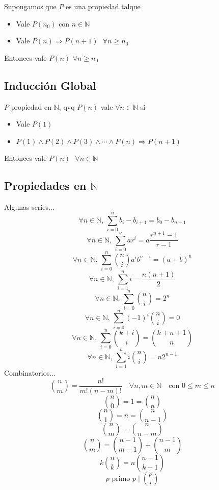 \documentclass[a4paper,10pt]{article}
\begin{document}
Supongamos que $P$ es una propiedad talque
\begin{itemize}
	\item Vale $P(n_0)$ con $n \in \mathbb{N}$
	\item Vale $P(n) \Rightarrow P(n+1) \mbox{ } \forall n \geq n_0$
\end{itemize} 
Entonces vale $P(n)$  $\forall n \geq n_0$


\subsection{Inducción Global}


$P$ propiedad en $\mathbb{N}$, qvq $P(n)$ vale $\forall n \in \mathbb{N}$ si 
\begin{itemize}
	\item Vale $P(1)$
	\item $P(1) \wedge P(2) \wedge P(3) \wedge \cdots \wedge P(n) \Rightarrow P(n+1)$
\end{itemize}
Entonces vale $P(n) \mbox{ } \forall n \in \mathbb{N}$


\subsection{Propiedades en $\mathbb{N}$}


Algunas series...
{\fontsize{12pt}{12pt} \selectfont %
$$\forall n \in \mathbb{N} \mbox{,   } \sum_{i = 0}^{n} {b_{i}-b_{i+1}} = b_{0} - b_{n+1} $$
$$\forall n \in \mathbb{N} \mbox{,   } \sum_{i = 0}^{n} {a{r}^{i}} = a \frac {{r}^{n+1}-1} {r-1} $$
$$\forall n \in \mathbb{N} \mbox{,   } \sum_{i = 0}^{n} {\binom{n}{i} {a}^{i} {b}^{n-i}} = {(a + b)}^n $$
$$\forall n \in \mathbb{N} \mbox{,   } \sum_{i = 1}^{n} {i} = \frac {n(n + 1)} {2} $$
$$\forall n \in \mathbb{N} \mbox{,   } \sum_{i = 0}^{n} {\binom{n}{i}} = 2^{n} $$
$$\forall n \in \mathbb{N} \mbox{,   } \sum_{i = 0}^{n} {{(-1)}^{i}\binom{n}{i}} = 0 $$
$$\forall n \in \mathbb{N} \mbox{,   } \sum_{i = 0}^{n} {\binom{k+i}{i}} = \binom{k+n+1}{n} $$
$$\forall n \in \mathbb{N} \mbox{,   } \sum_{i = 1}^{n} {i\binom{n}{i}} = n {2}^{n-1}$$
Combinatorios...
$$\binom{n}{m} = \frac {n!}{m!(n-m)!} \quad \forall n,m \in \mathbb{N} \quad \mbox{con } 0 \leq m \leq n $$
$$\binom{n}{0} = 1 = \binom {n} {n}$$
$$\binom{n}{1} = n = \binom {n} {n-1}$$
$$\binom{n}{m} = \binom {n}{n-m}$$
$$\binom{n}{m} = \binom {n-1} {m-1} + \binom {n-1} {m}$$
$$k\binom{n}{k} = n \binom {n-1} {k-1}$$
$$p\mbox{ primo } p \mid {\binom{p}{i}}$$
}
\end{document}
